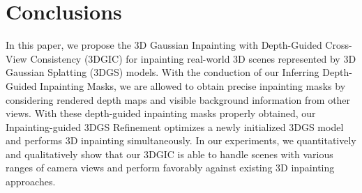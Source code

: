 \section{Conclusions}
In this paper, we propose the 3D Gaussian Inpainting with Depth-Guided Cross-View Consistency (3DGIC) for inpainting real-world 3D scenes represented by 3D Gaussian Splatting (3DGS) models. With the conduction of our Inferring Depth-Guided Inpainting Masks, we are allowed to obtain precise inpainting masks by considering rendered depth maps and visible background information from other views. With these depth-guided inpainting masks properly obtained, our Inpainting-guided 3DGS Refinement optimizes a newly initialized 3DGS model and performs 3D inpainting simultaneously. In our experiments, we quantitatively and qualitatively show that our 3DGIC is able to handle scenes with various ranges of camera views and perform favorably against existing 3D inpainting approaches.